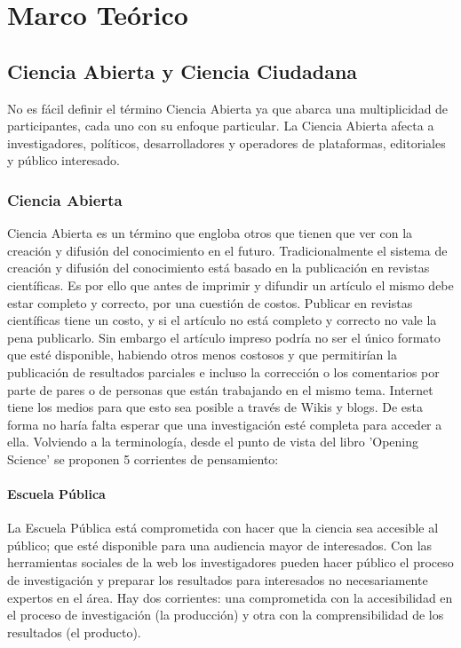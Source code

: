 \chapter{Marco Teórico}
\section{Ciencia  Abierta y Ciencia Ciudadana}

No es fácil definir el término Ciencia Abierta ya que abarca una multiplicidad de participantes, cada uno con su enfoque particular. La Ciencia Abierta afecta a investigadores, políticos, desarrolladores y operadores de plataformas, editoriales y público interesado. 

\subsection{Ciencia Abierta}
Ciencia Abierta es un término que engloba otros que tienen que ver con la creación y difusión del conocimiento en el futuro. Tradicionalmente el sistema de creación y difusión del conocimiento está basado en la publicación en revistas científicas. Es por ello que antes de imprimir y difundir un artículo el mismo debe estar completo y correcto, por una cuestión de costos. Publicar en revistas científicas tiene un costo, y si el artículo no está completo y correcto no vale la pena publicarlo. Sin embargo el artículo impreso podría no ser el único formato que esté disponible, habiendo otros menos costosos y que permitirían la publicación de resultados parciales e incluso la corrección o los comentarios por parte de pares o de personas que están trabajando en el mismo tema. Internet tiene los medios para que esto sea posible a través de Wikis y blogs. De esta forma no haría falta esperar que una investigación esté completa para acceder a ella.
Volviendo a la terminología, desde el punto de vista del libro 'Opening Science' \cite{bartling2014opening} se proponen 5 corrientes de pensamiento:

\subsubsection{Escuela Pública} 

	La Escuela Pública está comprometida con hacer que la ciencia sea accesible al público; que esté disponible para una audiencia mayor de interesados. Con las herramientas sociales de la web los investigadores pueden hacer público el proceso de investigación y preparar los resultados para interesados no necesariamente expertos en el área. Hay dos corrientes: una comprometida con la accesibilidad en el proceso de investigación (la producción) y otra con la comprensibilidad de los resultados (el producto).
	
